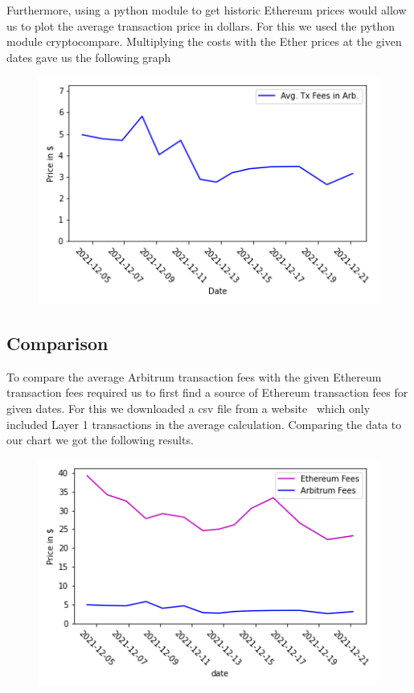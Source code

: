 \documentclass[a4paper,oneside,openright,11pt]{report}
\begin{document}
	Furthermore, using a python module to get historic Ethereum prices would allow us to plot the average
	transaction price in dollars. For this we used the python module cryptocompare. Multiplying the costs
	with the Ether prices at the given dates gave us the following graph
	
	\begin{figure}[h]
		\centering
		\includegraphics[scale=0.8]{./Pictures/arb_avg_usd.png}
		\label{fig:Average_Arbitrum_USD_Fees}
	\end{figure}
	
	\subsection{Comparison}
	To compare the average Arbitrum transaction fees with the given Ethereum transaction fees required us
	to first find a source of Ethereum transaction fees for given dates. For this we downloaded a csv file from
	a website~\cite{ETHFees} which only included Layer 1 transactions in the average calculation. Comparing the
	data to our chart we got the following results.
	
	\begin{figure}[h]
		\centering
		\includegraphics[scale=0.8]{./Pictures/arb_eth_fees.png}
		\label{fig:Arbitrum_Ethereum_Fees}
	\end{figure}
	
\end{document}
